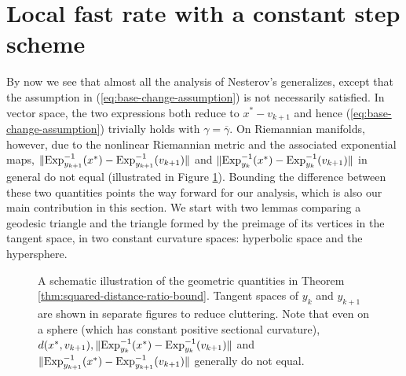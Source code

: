 \section{Local fast rate with a constant step scheme} \label{sec:constant-step-analysis}

By now we see that almost all the analysis of Nesterov's generalizes, except that the assumption in (\ref{eq:base-change-assumption}) is not necessarily satisfied. In vector space, the two expressions both reduce to $x^* - v_{k+1}$ and hence (\ref{eq:base-change-assumption}) trivially holds with $\gamma = \overline{\gamma}$. On Riemannian manifolds, however, due to the nonlinear Riemannian metric and the associated exponential maps,  $\| \mathrm{Exp}_{y_{k+1}}^{-1}(x^*) -\mathrm{Exp}_{y_{k+1}}^{-1}(v_{k+1})\|$ and $\|\mathrm{Exp}_{y_k}^{-1}(x^*)-\mathrm{Exp}_{y_k}^{-1}(v_{k+1})\|$ in general do not equal (illustrated in Figure \ref{fig:change-base}). Bounding the difference between these two quantities points the way forward for our analysis, which is also our main contribution in this section. We start with two lemmas comparing a geodesic triangle and the triangle formed by the preimage of its vertices in the tangent space, in two constant curvature spaces: hyperbolic space and the hypersphere.
\begin{figure}[hbt]
	\centering \hspace{30pt} \def\svgwidth{220pt}
	 \hspace{-80pt} \def\svgwidth{190pt} 
	 \hspace{-30pt}
	\caption{A schematic illustration of the geometric quantities in Theorem \ref{thm:squared-distance-ratio-bound}. Tangent spaces of $y_{k}$ and $y_{k+1}$ are shown in separate figures to reduce cluttering. Note that even on a sphere (which has constant positive sectional curvature), $d(x^*, v_{k+1}), \|\mathrm{Exp}_{y_{k}}^{-1}(x^*)-\mathrm{Exp}_{y_{k}}^{-1}(v_{k+1})\|$ and $ \|\mathrm{Exp}_{y_{k+1}}^{-1}(x^*)-\mathrm{Exp}_{y_{k+1}}^{-1}(v_{k+1})\|$ generally do not equal.} \label{fig:change-base}
\end{figure}

